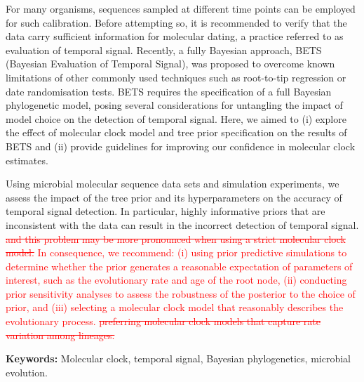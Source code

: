 \documentclass[10pt,letterpaper]{article}
\begin{document}
For many organisms, sequences sampled at different time points can be employed for such calibration. Before attempting so, it is recommended to verify that the data carry sufficient information for molecular dating, a practice referred to as evaluation of temporal signal. Recently, a fully Bayesian approach, BETS (Bayesian Evaluation of Temporal Signal), was proposed to overcome known limitations of other commonly used techniques such as root-to-tip regression or date randomisation tests. BETS requires the specification of a full Bayesian phylogenetic model, posing several considerations for untangling the impact of model choice on the detection of temporal signal. Here, we aimed to (i) explore the effect of molecular clock model and tree prior specification on the results of BETS and (ii) provide guidelines for improving our confidence in molecular clock estimates. 

Using microbial molecular sequence data sets and simulation experiments, we assess the impact of the tree prior and its hyperparameters on the accuracy of temporal signal detection. In particular, highly informative priors that are inconsistent with the data can result in the incorrect detection of temporal signal. \textcolor{red}{\sout{and this problem may be more pronounced when using a strict molecular clock model.}} \textcolor{red}{In consequence, we recommend: (i) using prior predictive simulations to determine whether the prior generates a reasonable expectation of parameters of interest, such as the evolutionary rate and age of the root node, (ii) conducting prior sensitivity analyses to assess the robustness of the posterior to the choice of prior, and (iii) selecting a molecular clock model that reasonably describes the evolutionary process. \sout{preferring molecular clock models that capture rate variation among lineages.}}
\newline

\textbf{Keywords:} Molecular clock, temporal signal, Bayesian phylogenetics, microbial evolution. 



\end{document}
